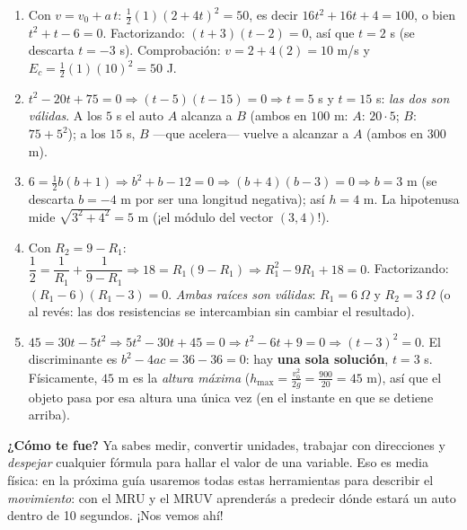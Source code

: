 \documentclass[12pt, letterpaper]{article}
\begin{document}
\begin{enumerate}[leftmargin=*, label=\textbf{\arabic*.}]
    \item Con $v = v_0 + a\,t$: $\frac{1}{2}(1)(2 + 4t)^2 = 50$, es decir $16t^2 + 16t + 4 = 100$, o bien $t^2 + t - 6 = 0$. Factorizando: $(t + 3)(t - 2) = 0$, así que $t = 2$ s (se descarta $t = -3$ s). Comprobación: $v = 2 + 4(2) = 10$ m/s y $E_c = \frac{1}{2}(1)(10)^2 = 50$ J. \checkmark
    \item $t^2 - 20t + 75 = 0 \Rightarrow (t - 5)(t - 15) = 0 \Rightarrow t = 5$ s y $t = 15$ s: \emph{las dos son válidas}. A los $5$ s el auto $A$ alcanza a $B$ (ambos en $100$ m: $A$: $20 \cdot 5$; $B$: $75 + 5^2$); a los $15$ s, $B$ ---que acelera--- vuelve a alcanzar a $A$ (ambos en $300$ m).
    \item $6 = \frac{1}{2}b(b + 1) \Rightarrow b^2 + b - 12 = 0 \Rightarrow (b + 4)(b - 3) = 0 \Rightarrow b = 3$ m (se descarta $b = -4$ m por ser una longitud negativa); así $h = 4$ m. La hipotenusa mide $\sqrt{3^2 + 4^2} = 5$ m (¡el módulo del vector $(3,4)$!).
    \item Con $R_2 = 9 - R_1$: $\dfrac{1}{2} = \dfrac{1}{R_1} + \dfrac{1}{9 - R_1} \Rightarrow 18 = R_1(9 - R_1) \Rightarrow R_1^2 - 9R_1 + 18 = 0$. Factorizando: $(R_1 - 6)(R_1 - 3) = 0$. \emph{Ambas raíces son válidas}: $R_1 = 6\ \Omega$ y $R_2 = 3\ \Omega$ (o al revés: las dos resistencias se intercambian sin cambiar el resultado).
    \item $45 = 30t - 5t^2 \Rightarrow 5t^2 - 30t + 45 = 0 \Rightarrow t^2 - 6t + 9 = 0 \Rightarrow (t - 3)^2 = 0$. El discriminante es $b^2 - 4ac = 36 - 36 = 0$: hay \textbf{una sola solución}, $t = 3$ s. Físicamente, $45$ m es la \emph{altura máxima} ($h_{\max} = \frac{v_0^2}{2g} = \frac{900}{20} = 45$ m), así que el objeto pasa por esa altura una única vez (en el instante en que se detiene arriba).
  \end{enumerate}

  \vspace{8pt}
  \begin{cuadroinfo}
    \small
    \textbf{¿Cómo te fue?} Ya sabes medir, convertir unidades, trabajar con direcciones y \emph{despejar} cualquier fórmula para hallar el valor de una variable. Eso es media física: en la próxima guía usaremos todas estas herramientas para describir el \emph{movimiento}: con el MRU y el MRUV aprenderás a predecir dónde estará un auto dentro de 10 segundos. ¡Nos vemos ahí!
  \end{cuadroinfo}

\fi
\end{document}
